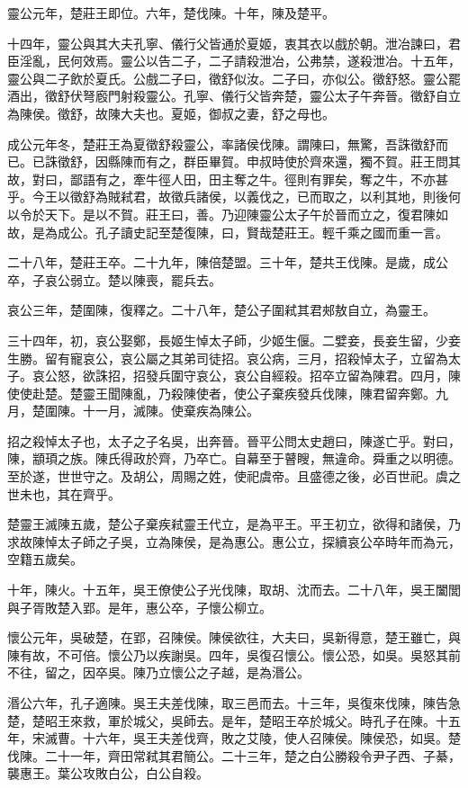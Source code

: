 靈公元年，楚莊王即位。六年，楚伐陳。十年，陳及楚平。

十四年，靈公與其大夫孔寧、儀行父皆通於夏姬，衷其衣以戲於朝。泄冶諫曰，君臣淫亂，民何效焉。靈公以告二子，二子請殺泄冶，公弗禁，遂殺泄冶。十五年，靈公與二子飲於夏氏。公戲二子曰，徵舒似汝。二子曰，亦似公。徵舒怒。靈公罷酒出，徵舒伏弩廏門射殺靈公。孔寧、儀行父皆奔楚，靈公太子午奔晉。徵舒自立為陳侯。徵舒，故陳大夫也。夏姬，御叔之妻，舒之母也。

成公元年冬，楚莊王為夏徵舒殺靈公，率諸侯伐陳。謂陳曰，無驚，吾誅徵舒而已。已誅徵舒，因縣陳而有之，群臣畢賀。申叔時使於齊來還，獨不賀。莊王問其故，對曰，鄙語有之，牽牛徑人田，田主奪之牛。徑則有罪矣，奪之牛，不亦甚乎。今王以徵舒為賊弒君，故徵兵諸侯，以義伐之，已而取之，以利其地，則後何以令於天下。是以不賀。莊王曰，善。乃迎陳靈公太子午於晉而立之，復君陳如故，是為成公。孔子讀史記至楚復陳，曰，賢哉楚莊王。輕千乘之國而重一言。

二十八年，楚莊王卒。二十九年，陳倍楚盟。三十年，楚共王伐陳。是歲，成公卒，子哀公弱立。楚以陳喪，罷兵去。

哀公三年，楚圍陳，復釋之。二十八年，楚公子圍弒其君郟敖自立，為靈王。

三十四年，初，哀公娶鄭，長姬生悼太子師，少姬生偃。二嬖妾，長妾生留，少妾生勝。留有寵哀公，哀公屬之其弟司徒招。哀公病，三月，招殺悼太子，立留為太子。哀公怒，欲誅招，招發兵圍守哀公，哀公自經殺。招卒立留為陳君。四月，陳使使赴楚。楚靈王聞陳亂，乃殺陳使者，使公子棄疾發兵伐陳，陳君留奔鄭。九月，楚圍陳。十一月，滅陳。使棄疾為陳公。

招之殺悼太子也，太子之子名吳，出奔晉。晉平公問太史趙曰，陳遂亡乎。對曰，陳，顓頊之族。陳氏得政於齊，乃卒亡。自幕至于瞽瞍，無違命。舜重之以明德。至於遂，世世守之。及胡公，周賜之姓，使祀虞帝。且盛德之後，必百世祀。虞之世未也，其在齊乎。

楚靈王滅陳五歲，楚公子棄疾弒靈王代立，是為平王。平王初立，欲得和諸侯，乃求故陳悼太子師之子吳，立為陳侯，是為惠公。惠公立，探續哀公卒時年而為元，空籍五歲矣。

十年，陳火。十五年，吳王僚使公子光伐陳，取胡、沈而去。二十八年，吳王闔閭與子胥敗楚入郢。是年，惠公卒，子懷公柳立。

懷公元年，吳破楚，在郢，召陳侯。陳侯欲往，大夫曰，吳新得意，楚王雖亡，與陳有故，不可倍。懷公乃以疾謝吳。四年，吳復召懷公。懷公恐，如吳。吳怒其前不往，留之，因卒吳。陳乃立懷公之子越，是為湣公。

湣公六年，孔子適陳。吳王夫差伐陳，取三邑而去。十三年，吳復來伐陳，陳告急楚，楚昭王來救，軍於城父，吳師去。是年，楚昭王卒於城父。時孔子在陳。十五年，宋滅曹。十六年，吳王夫差伐齊，敗之艾陵，使人召陳侯。陳侯恐，如吳。楚伐陳。二十一年，齊田常弒其君簡公。二十三年，楚之白公勝殺令尹子西、子綦，襲惠王。葉公攻敗白公，白公自殺。

